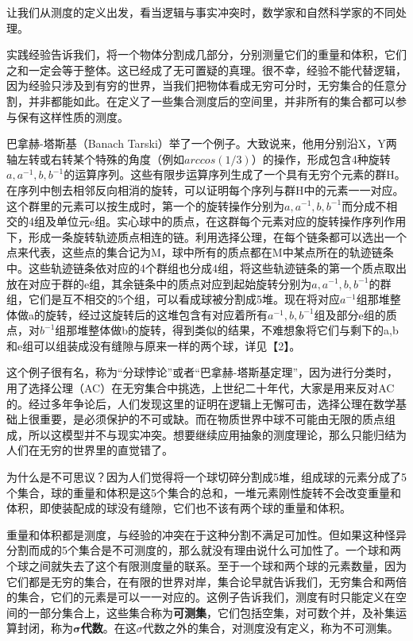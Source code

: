 让我们从测度的定义出发，看当逻辑与事实冲突时，数学家和自然科学家的不同处理。

实践经验告诉我们，将一个物体分割成几部分，分别测量它们的重量和体积，它们之和一定会等于整体。这已经成了无可置疑的真理。很不幸，经验不能代替逻辑，因为经验只涉及到有穷的世界，当我们把物体看成无穷可分时，无穷集合的任意分割，并非都能如此。在定义了一些集合测度后的空间里，并非所有的集合都可以参与保有这样性质的测度。

\kaishu\setlength{\leftskip}{1em}

巴拿赫-塔斯基（Banach Tarski）举了一个例子。大致说来，他用分别沿X，Y两轴左转或右转某个特殊的角度（例如$ arccos(1/3) $）的操作，形成包含4种旋转$ a,a^{-1},b,b^{-1} $的运算序列。这些有限步运算序列生成了一个具有无穷个元素的群H。在序列中刨去相邻反向相消的旋转，可以证明每个序列与群H中的元素一一对应。这个群里的元素可以按生成时，第一个的旋转操作分别为$ a,a^{-1},b,b^{-1} $而分成不相交的4组及单位元e组。实心球中的质点，在这群每个元素对应的旋转操作序列作用下，形成一条旋转轨迹质点相连的链。利用选择公理，在每个链条都可以选出一个点来代表，这些点的集合记为M，球中所有的质点都在M中某点所在的轨迹链条中。这些轨迹链条依对应的4个群组也分成4组，将这些轨迹链条的第一个质点取出放在对应于群的e组，其余链条中的质点对应到起始旋转分别为$ a,a^{-1},b,b^{-1} $的群组，它们是互不相交的5个组，可以看成球被分割成5堆。现在将对应$ a^{-1} $组那堆整体做a的旋转，经过这旋转后的这堆包含有对应着所有$ a^{-1},b,b^{-1} $组及部分e组的质点，对$ b^{-1} $组那堆整体做b的旋转，得到类似的结果，不难想象将它们与剩下的a,b和e组可以组装成没有缝隙与原来一样的两个球，详见【2】。

这个例子很有名，称为“分球悖论”或者“巴拿赫-塔斯基定理”，因为进行分类时，用了选择公理（AC）在无穷集合中挑选，上世纪二十年代，大家是用来反对AC的。经过多年争论后，人们发现这里的证明在逻辑上无懈可击，选择公理在数学基础上很重要，是必须保护的不可或缺。而在物质世界中球不可能由无限的质点组成，所以这模型并不与现实冲突。想要继续应用抽象的测度理论，那么只能归结为人们在无穷的世界里的直觉错了。

\songti\setlength{\leftskip}{0em}

为什么是不可思议？因为人们觉得将一个球切碎分割成5堆，组成球的元素分成了5个集合，球的重量和体积是这5个集合的总和，一堆元素刚性旋转不会改变重量和体积，即使装配成的球没有缝隙，它们也不该有两个球的重量和体积。

重量和体积都是测度，与经验的冲突在于这种分割不满足可加性。但如果这种怪异分割而成的5个集合是不可测度的，那么就没有理由说什么可加性了。一个球和两个球之间就失去了这个有限测度量的联系。至于一个球和两个球的元素数量，因为它们都是无穷的集合，在有限的世界对岸，集合论早就告诉我们，无穷集合和两倍的集合，它们的元素是可以一一对应的。这例子告诉我们，测度有时只能定义在空间的一部分集合上，这些集合称为\textbf{可测集}，它们包括空集，对可数个并，及补集运算封闭，称为$ \bm{\sigma} $\textbf{代数}。在这$ \sigma $代数之外的集合，对测度没有定义，称为不可测集。

